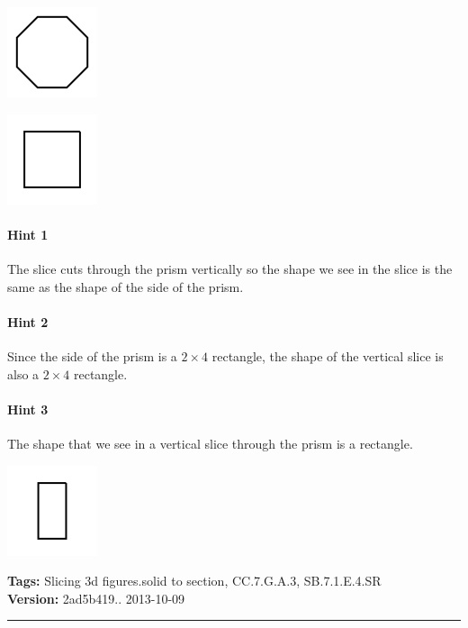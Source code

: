 \documentclass[twocolumn,10pt]{article}
\def\shrinkfactor{0.4}
\begin{document}
\includegraphics[scale=\shrinkfactor]{figures/7d98a99c75a84da8f748444ad7a3a8053be16a27.png}


\includegraphics[scale=\shrinkfactor]{figures/4b59a0ece6acc7c19c389e1de534d1df93bf1169.png}



\paragraph{Hint 1}The slice cuts through the prism vertically so the shape we see in the slice is the same as the shape of the side of the prism.

\paragraph{Hint 2}Since the side of the prism is a $2 \times 4$ rectangle, the shape of the vertical slice is also a $2 \times 4$ rectangle.

\paragraph{Hint 3}The shape that we see in a vertical slice through the prism is a rectangle.   

\includegraphics[scale=\shrinkfactor]{figures/225bc3d058cebe2059fc56f78ef80b5f3e0f2da7.png}



\medskip
\noindent
\textbf{Tags:} {\footnotesize Slicing 3d figures.solid to section, CC.7.G.A.3, SB.7.1.E.4.SR}\\
\textbf{Version:} 2ad5b419.. 2013-10-09
\smallskip\hrule
\end{document}
